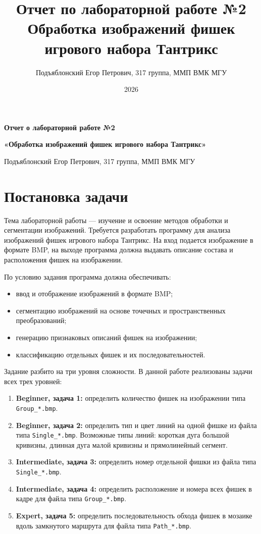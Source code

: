 \documentclass[12pt,a4paper]{article}
\title{Отчет по лабораторной работе №2\\Обработка изображений фишек игрового набора Тантрикс}
\author{Подъяблонский Егор Петрович, 317 группа, ММП ВМК МГУ}
\date{2026}
\begin{document}
\begin{center}
    {\LARGE \textbf{Отчет о лабораторной работе №2}\par}
    \vspace{0.3cm}
    {\Large \textbf{«Обработка изображений фишек игрового набора Тантрикс»}\par}
    \vspace{0.5cm}
    {\large Подъяблонский Егор Петрович, 317 группа, ММП ВМК МГУ\par}
\end{center}
\vspace{1cm}

\tableofcontents
\newpage

\section{Постановка задачи}
Тема лабораторной работы --- изучение и освоение методов обработки и сегментации изображений. Требуется разработать программу для анализа изображений фишек игрового набора Тантрикс. На вход подается изображение в формате BMP, на выходе программа должна выдавать описание состава и расположения фишек на изображении.

По условию задания программа должна обеспечивать:
\begin{itemize}[leftmargin=1.2cm]
    \item ввод и отображение изображений в формате BMP;
    \item сегментацию изображений на основе точечных и пространственных преобразований;
    \item генерацию признаковых описаний фишек на изображении;
    \item классификацию отдельных фишек и их последовательностей.
\end{itemize}

Задание разбито на три уровня сложности. В данной работе реализованы задачи всех трех уровней:
\begin{enumerate}[leftmargin=1.2cm]
    \item \textbf{Beginner, задача 1:} определить количество фишек на изображении типа \texttt{Group\_*.bmp}.
    \item \textbf{Beginner, задача 2:} определить тип и цвет линий на одной фишке из файла типа \texttt{Single\_*.bmp}. Возможные типы линий: короткая дуга большой кривизны, длинная дуга малой кривизны и прямолинейный сегмент.
    \item \textbf{Intermediate, задача 3:} определить номер отдельной фишки из файла типа \texttt{Single\_*.bmp}.
    \item \textbf{Intermediate, задача 4:} определить расположение и номера всех фишек в кадре для файла типа \texttt{Group\_*.bmp}.
    \item \textbf{Expert, задача 5:} определить последовательность обхода фишек в мозаике вдоль замкнутого маршрута для файла типа \texttt{Path\_*.bmp}.
\end{enumerate}
\end{document}
